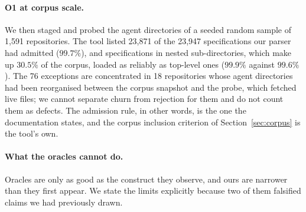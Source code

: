 \documentclass[smallextended,natbib]{svjour3}
\begin{document}
\paragraph{O1 at corpus scale.} We then staged and probed the agent directories of a seeded random
sample of 1{,}591 repositories. The tool listed 23{,}871 of the 23{,}947 specifications our parser
had admitted ($99.7\%$), and specifications in nested sub-directories, which make up $30.5\%$ of the
corpus, loaded as reliably as top-level ones ($99.9\%$ against $99.6\%$). The 76 exceptions are
concentrated in 18 repositories whose agent directories had been reorganised between the corpus
snapshot and the probe, which fetched live files; we cannot separate churn from rejection for them
and do not count them as defects. The admission rule, in other words, is the one the documentation
states, and the corpus inclusion criterion of Section~\ref{sec:corpus} is the tool's own.

\paragraph{What the oracles cannot do.}
\label{sec:oraclelimits}
Oracles are only as good as the construct they observe, and ours are narrower than they first appear.
We state the limits explicitly because two of them falsified claims we had previously drawn.
\end{document}
